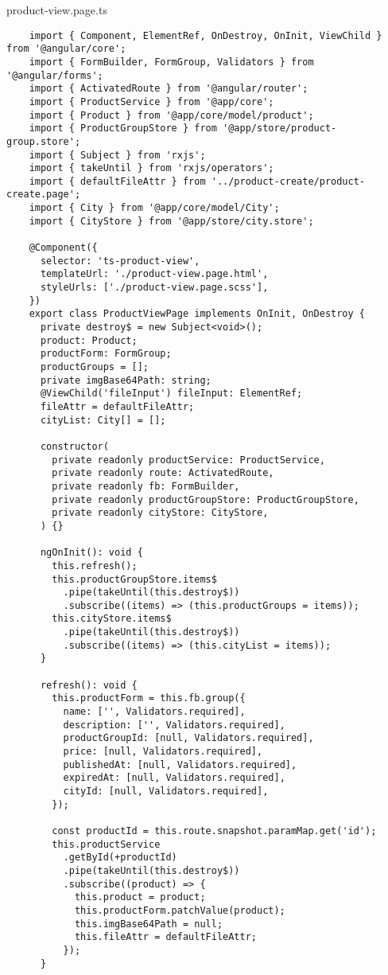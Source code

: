 product-view.page.ts
\begin{lstlisting}
    import { Component, ElementRef, OnDestroy, OnInit, ViewChild } from '@angular/core';
    import { FormBuilder, FormGroup, Validators } from '@angular/forms';
    import { ActivatedRoute } from '@angular/router';
    import { ProductService } from '@app/core';
    import { Product } from '@app/core/model/product';
    import { ProductGroupStore } from '@app/store/product-group.store';
    import { Subject } from 'rxjs';
    import { takeUntil } from 'rxjs/operators';
    import { defaultFileAttr } from '../product-create/product-create.page';
    import { City } from '@app/core/model/City';
    import { CityStore } from '@app/store/city.store';
    
    @Component({
      selector: 'ts-product-view',
      templateUrl: './product-view.page.html',
      styleUrls: ['./product-view.page.scss'],
    })
    export class ProductViewPage implements OnInit, OnDestroy {
      private destroy$ = new Subject<void>();
      product: Product;
      productForm: FormGroup;
      productGroups = [];
      private imgBase64Path: string;
      @ViewChild('fileInput') fileInput: ElementRef;
      fileAttr = defaultFileAttr;
      cityList: City[] = [];
    
      constructor(
        private readonly productService: ProductService,
        private readonly route: ActivatedRoute,
        private readonly fb: FormBuilder,
        private readonly productGroupStore: ProductGroupStore,
        private readonly cityStore: CityStore,
      ) {}
    
      ngOnInit(): void {
        this.refresh();
        this.productGroupStore.items$
          .pipe(takeUntil(this.destroy$))
          .subscribe((items) => (this.productGroups = items));
        this.cityStore.items$
          .pipe(takeUntil(this.destroy$))
          .subscribe((items) => (this.cityList = items));
      }
    
      refresh(): void {
        this.productForm = this.fb.group({
          name: ['', Validators.required],
          description: ['', Validators.required],
          productGroupId: [null, Validators.required],
          price: [null, Validators.required],
          publishedAt: [null, Validators.required],
          expiredAt: [null, Validators.required],
          cityId: [null, Validators.required],
        });
    
        const productId = this.route.snapshot.paramMap.get('id');
        this.productService
          .getById(+productId)
          .pipe(takeUntil(this.destroy$))
          .subscribe((product) => {
            this.product = product;
            this.productForm.patchValue(product);
            this.imgBase64Path = null;
            this.fileAttr = defaultFileAttr;
          });
      }
    

\end{lstlisting}
